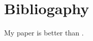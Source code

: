 \documentclass{article}
\begin{document}
\section{Bibliogaphy}
My paper is better than \cite{Aggarwal:2009}.

% 
% 
% 
% 
% 

\printbibliography
\end{document}
